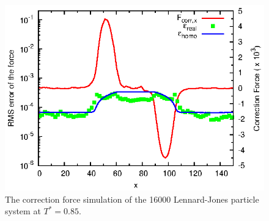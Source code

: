 \documentclass[aps,pre,preprint]{revtex4}
\begin{document}
\begin{figure}
  \centering
  \includegraphics[]{fig/t0.85-n16000-fcorr-rc07.5-feq0200/fcorr.and.error.eps}
  \caption{The correction force simulation of the 16000 Lennard-Jones
    particle system at $T^\ast=0.85$.}
  \label{fig:tmp4}
\end{figure}
\end{document}
